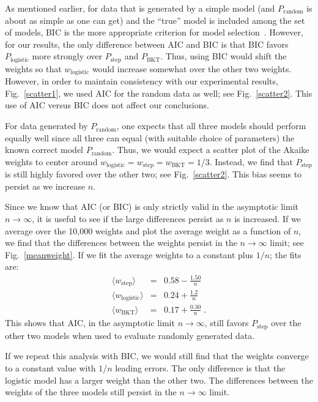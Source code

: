 \documentclass{edm_template}
\begin{document}
As mentioned earlier, for data that is generated by a simple 
model (and $P_\mathrm{random}$ is about as
simple as one can get) and the ``true'' model is included among
the set of models, BIC is the more appropriate criterion
for model selection~\cite[Sections~6.3 \& 6.4]{burnham_model_2002}.
However, for our results, the only difference between AIC and BIC 
is that BIC favors $P_\mathrm{logistic}$ more strongly over 
$P_\mathrm{step}$ and $P_\mathrm{BKT}$.  Thus, using BIC would shift 
the weights so that $w_\mathrm{logistic}$ would increase somewhat over 
the other two weights.  However, in order to maintain consistency with
our experimental results, Fig.~\ref{scatter1}, we used AIC for the random data as well;
see Fig.~\ref{scatter2}.  This use of AIC versus BIC does not 
affect our conclusions.

For data generated by $P_\mathrm{random}$,
one expects that all three models should perform equally
well since all three can equal (with suitable choice of parameters)
the known correct model $P_\mathrm{random}$.  Thus, we would expect
a scatter plot of the Akaike weights to center around
$w_\mathrm{logistic}=w_\mathrm{step}=w_\mathrm{BKT}=1/3$.  Instead, we
find that $P_\mathrm{step}$ is still highly favored over the other two; see
Fig.~\ref{scatter2}. This bias seems to persist as we increase $n$.

Since we know that AIC (or BIC) is only strictly valid in
the asymptotic limit $n\to\infty$, it is useful to see if
the large differences persist as $n$ is increased.
If we average over the 10,000 weights and plot the average weight 
as a function of $n$, we find
that the differences between the weights persist
in the $n\to\infty$ limit;  see Fig.~\ref{meanweight}.
If we fit the average weights to a constant plus $1/n$;
the fits are:
%
\begin{eqnarray}
 \langle w_\mathrm{step}\rangle &=& 0.58 - \frac{1.50}{n} \\
 \langle w_\mathrm{logistic}\rangle &=& 0.24 + \frac{1.2}{n} \\
 \langle w_\mathrm{BKT}\rangle &=& 0.17+\frac{0.30}{n} \; .
\end{eqnarray}
%
This shows that AIC, in the asymptotic limit $n\to\infty$, 
still favors  $P_\mathrm{step}$ over the other two models
when used to evaluate randomly generated data.

If we repeat this analysis with BIC, we would still
find that the weights converge to a constant value with 
$1/n$ leading errors.  The only difference is that the logistic
model has a larger weight than the other two. 
The differences between the weights of the three models still persist
in the $n\to\infty$ limit.
\end{document}
